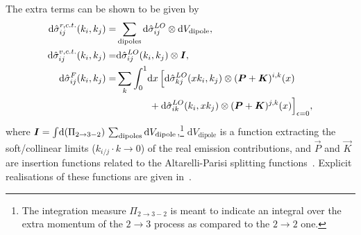 \documentclass[../main.tex]{subfiles}
\begin{document}
The extra terms can be shown to be given by
\begin{subequations}
  \begin{align}
    \mathrm{d}\hat\sigma_{ij}^{r, c.t.}(k_i,k_j) = & \sum_{\text{dipoles}} \mathrm{d}\hat\sigma_{ij}^{LO} \otimes \mathrm{d}V_{\text{dipole}},                        \\
    \mathrm{d}\hat\sigma_{ij}^{v, c.t.}(k_i,k_j) = & \mathrm{d}\hat\sigma_{ij}^{LO}(k_i,k_j) \otimes \vec{I},                                                         \\
    \nonumber
    \mathrm{d}\hat\sigma_{ij}^{F}(k_i, k_j) =      & \sum_{k}\integral[_0^1]{x} \Bigl[\mathrm{d}\hat\sigma_{k j}^{LO}(xk_i,k_j) \otimes (\vec{P}+\vec{K})^{i,k}(x)    \\
                                                   & \hspace{1.2cm} + \mathrm{d}\hat\sigma^{LO}_{ik}(k_i,xk_j) \otimes (\vec{P}+\vec{K})^{j,k}(x)\Bigr]_{\epsilon=0},
  \end{align}
\end{subequations}
where \(\vec{I} = \integral{(\Pi_{2 \to 3-2})} \sum_{\text{dipoles}} \mathrm{d}V_{\text{dipole}}\),\footnote{The integration measure \(\Pi_{2\to 3-2}\) is meant to indicate an integral over the extra momentum of the \(2 \to 3\) process as compared to the \(2 \to 2\) one.} \(\mathrm{d}V_{\text{dipole}}\) is a function extracting the soft/collinear limits (\(k_{i/j} \cdot k \to 0\)) of the real emission contributions, and \(\vec{P}\) and \(\vec{K}\) are insertion functions related to the Altarelli-Parisi splitting functions~\cite{Altarelli:1977zs}.
Explicit realisations of these functions are given in~\cite{Catani:1996vz}.


\ifSubfilesClassLoaded{%
  {}
  
}{}
\end{document}
